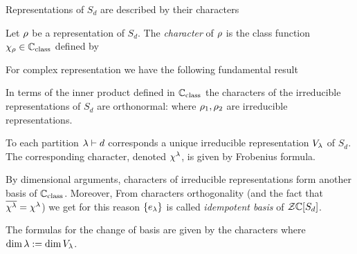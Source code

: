 \documentclass[10pt]{beamer}
\begin{document}
\begin{frame}

Representations of $S_d$ are described by their characters

\begin{definition}
	Let $\rho$ be a representation of $S_d$. The \emph{character} of $\rho$ is the class function $\chi_\rho\in\mathbb C_{\text{class}}$ defined by
	\deq{\c_\r(\s):=\tr(\r(\s))}
\end{definition}

For complex representation we have the following fundamental result
\begin{theorem}
	In terms of the inner product defined in $\mathbb C_{\text{class}}$ the characters of the irreducible representations of $S_d$ are orthonormal:
	where $\rho_1,\rho_2$ are irreducible representations.  
\end{theorem}

\end{frame}

\begin{frame}

\begin{theorem}
	To each partition $\lambda\vdash d$ corresponds a unique irreducible representation $V_\lambda$ of $S_d$. The corresponding character, denoted $\chi^\lambda$, is given by Frobenius formula.
\end{theorem}

By dimensional arguments, characters of irreducible representations form another basis of $\mathbb C_{\text{class}}$. Moreover, 
From characters orthogonality (and the fact that $\overline{\chi^\lambda}=\chi^\lambda$) we get
for this reason $\{e_\lambda\}$ is called \emph{idempotent basis} of $\mathcal Z\mathbb C[S_d]$.

The formulas for the change of basis are given by the characters
where $\dim \lambda:=\dim V_\lambda$. 

\end{frame}
\end{document}
